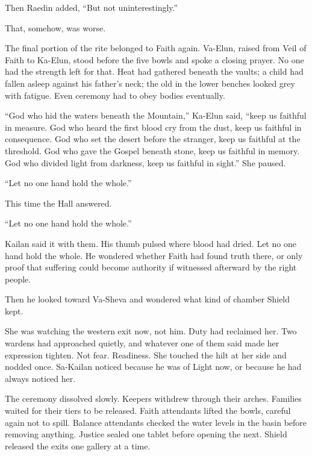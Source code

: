 Then Raedin added, “But not uninterestingly.”\par

That, somehow, was worse.\par

The final portion of the rite belonged to Faith again. Va-Elun, raised from Veil of Faith to Ka-Elun, stood before the five bowls and spoke a closing prayer. No one had the strength left for that. Heat had gathered beneath the vaults; a child had fallen asleep against his father’s neck; the old in the lower benches looked grey with fatigue. Even ceremony had to obey bodies eventually.\par

\begin{scripture}
“God who hid the waters beneath the Mountain,” Ka-Elun said, “keep us faithful in measure. God who heard the first blood cry from the dust, keep us faithful in consequence. God who set the desert before the stranger, keep us faithful at the threshold. God who gave the Gospel beneath stone, keep us faithful in memory. God who divided light from darkness, keep us faithful in sight.” She paused.
\end{scripture}

\begin{scripture}
“Let no one hand hold the whole.”
\end{scripture}

This time the Hall answered.\par

“Let no one hand hold the whole.”\par

Kailan said it with them. His thumb pulsed where blood had dried. Let no one hand hold the whole. He wondered whether Faith had found truth there, or only proof that suffering could become authority if witnessed afterward by the right people.\par

Then he looked toward Va-Sheva and wondered what kind of chamber Shield kept.\par

She was watching the western exit now, not him. Duty had reclaimed her. Two wardens had approached quietly, and whatever one of them said made her expression tighten. Not fear. Readiness. She touched the hilt at her side and nodded once. Sa-Kailan noticed because he was of Light now, or because he had always noticed her.\par

The ceremony dissolved slowly. Keepers withdrew through their arches. Families waited for their tiers to be released. Faith attendants lifted the bowls, careful again not to spill. Balance attendants checked the water levels in the basin before removing anything. Justice sealed one tablet before opening the next. Shield released the exits one gallery at a time.\par

